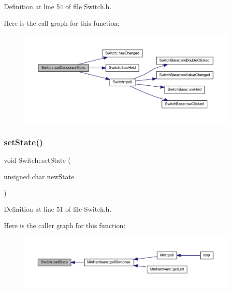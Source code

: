 Definition at line 54 of file Switch.\+h.

Here is the call graph for this function\+:
\nopagebreak
\begin{figure}[H]
\begin{center}
\leavevmode
\includegraphics[width=350pt]{d9/d47/class_switch_ad1991a92a3b5c470d667a5e26c59ef59_cgraph}
\end{center}
\end{figure}
\mbox{\label{class_switch_a29ddb1bfd9284e52b4adb0063d69371c}} 
\subsubsection{\texorpdfstring{set\+State()}{setState()}}
{\footnotesize\ttfamily void Switch\+::set\+State (\begin{DoxyParamCaption}\item[{unsigned char}]{new\+State }\end{DoxyParamCaption})\hspace{0.3cm}{\ttfamily [inline]}}



Definition at line 51 of file Switch.\+h.

Here is the caller graph for this function\+:
\nopagebreak
\begin{figure}[H]
\begin{center}
\leavevmode
\includegraphics[width=350pt]{d9/d47/class_switch_a29ddb1bfd9284e52b4adb0063d69371c_icgraph}
\end{center}
\end{figure}
\mbox{\label{class_switch_af4d055387cb6f0a2278db5f0b4f01ede}} 
